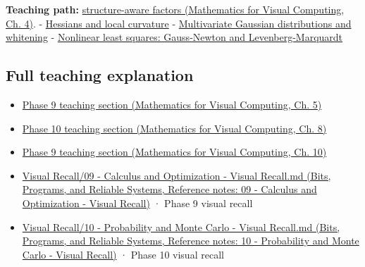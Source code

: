 \textbf{Teaching path:} \href{../02-Mathematics-for-Visual-Computing/main.pdf\#nameddest=01-foundations-i-ch020-structure-makes-a-decomposition-a-better-tool-than-generic-elimination}{structure-aware factors (Mathematics for Visual Computing, Ch. 4)}. - \hyperref[appendix-6ac071f8b50c]{Hessians and local curvature} - \hyperref[appendix-12bbe185dbe5]{Multivariate Gaussian distributions and whitening} - \hyperref[appendix-2c2df8345991]{Nonlinear least squares: Gauss-Newton and Levenberg-Marquardt}

\subsection{Full teaching explanation}\label{appendix-50d2ea3c9b26-full-teaching-explanation}

\begin{itemize}
\tightlist
\item
  \href{../02-Mathematics-for-Visual-Computing/main.pdf\#nameddest=02-foundations-ii-ch021-jacobians-curvature-and-local-approximation}{Phase 9 teaching section (Mathematics for Visual Computing, Ch. 5)}
\item
  \href{../02-Mathematics-for-Visual-Computing/main.pdf\#nameddest=02-foundations-ii-ch024-waiting-times-event-counts-and-covariance-geometry}{Phase 10 teaching section (Mathematics for Visual Computing, Ch. 8)}
\item
  \href{../02-Mathematics-for-Visual-Computing/main.pdf\#nameddest=02-foundations-ii-ch026-optimization-and-inverse-problems}{Phase 9 teaching section (Mathematics for Visual Computing, Ch. 10)}
\item
  \href{../01-Bits-Programs-and-Reliable-Systems/main.pdf\#nameddest=appendix-adf48f5dc5c1}{Visual Recall/09 - Calculus and Optimization - Visual Recall.md (Bits, Programs, and Reliable Systems, Reference notes: 09 - Calculus and Optimization - Visual Recall)} · Phase 9 visual recall
\item
  \href{../01-Bits-Programs-and-Reliable-Systems/main.pdf\#nameddest=appendix-cb5af353ef77}{Visual Recall/10 - Probability and Monte Carlo - Visual Recall.md (Bits, Programs, and Reliable Systems, Reference notes: 10 - Probability and Monte Carlo - Visual Recall)} · Phase 10 visual recall
\end{itemize}
